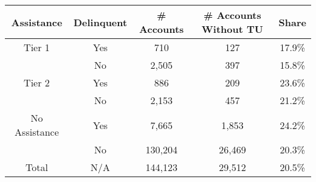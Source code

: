 \begin{tabular}{ccccc}
\toprule 
\midrule 
Assistance & Delinquent & \# Accounts & \# Accounts Without TU & Share \\
\midrule 
Tier 1 & Yes & 710 & 127 & 17.9\% \\
 & No & 2,505 & 397 & 15.8\% \\
\midrule 
Tier 2 & Yes & 886 & 209 & 23.6\% \\
 & No & 2,153 & 457 & 21.2\% \\
\midrule 
No Assistance & Yes & 7,665 & 1,853 & 24.2\% \\
 & No & 130,204 & 26,469 & 20.3\% \\
\midrule 
Total & N/A & 144,123 & 29,512 & 20.5\% \\
\midrule 
\bottomrule 
\end{tabular}
